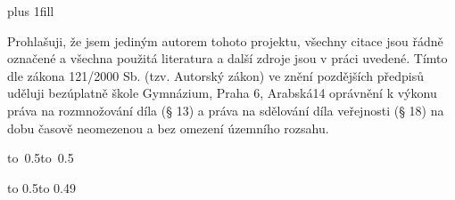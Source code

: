 \newpage



\openright
\hypersetup{pageanchor=true}
\pagestyle{plain}
\vglue 0pt plus 1fill

\noindent Prohlašuji, že jsem jediným autorem tohoto projektu, všechny citace
jsou řádně označené a všechna použitá literatura a další zdroje jsou v práci
uvedené.  Tímto dle zákona 121/2000 Sb. (tzv. Autorský zákon) ve znění
pozdějších předpisů uděluji bezúplatně škole Gymnázium, Praha 6, Arabská14
oprávnění k výkonu práva na rozmnožování díla (§ 13) a práva na sdělování díla
veřejnosti (§ 18) na dobu časově neomezenou a bez omezení územního rozsahu.

\vspace{10mm}

\hbox{\hbox to 0.5\hbox to 0.5}

\vspace{20mm}

%
%
%

\newpage


\openright

\vbox to 0.5\nobreak\vbox to 0.49

\newpage

\openright
\pagestyle{plain}
\setcounter{page}{1}
